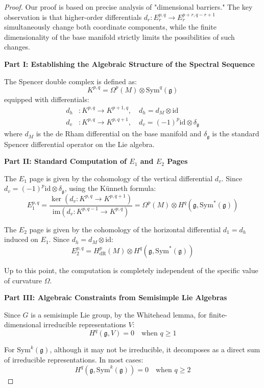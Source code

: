 \documentclass[a4paper,12pt]{extarticle}
\theoremstyle{definition}
\begin{document}
\begin{proof}
Our proof is based on precise analysis of "dimensional barriers." The key observation is that higher-order differentials $d_r: E_r^{p,q} \to E_r^{p+r,q-r+1}$ simultaneously change both coordinate components, while the finite dimensionality of the base manifold strictly limits the possibilities of such changes.

\textbf{Part I: Establishing the Algebraic Structure of the Spectral Sequence}

The Spencer double complex is defined as:
$$K^{p,q} = \Omega^p(M) \otimes \text{Sym}^q(\mathfrak{g})$$
equipped with differentials:
\begin{align}
d_h &: K^{p,q} \to K^{p+1,q}, \quad d_h = d_M \otimes \text{id} \\
d_v &: K^{p,q} \to K^{p,q+1}, \quad d_v = (-1)^p \text{id} \otimes \delta_\mathfrak{g}
\end{align}
where $d_M$ is the de Rham differential on the base manifold and $\delta_\mathfrak{g}$ is the standard Spencer differential operator on the Lie algebra.

\textbf{Part II: Standard Computation of $E_1$ and $E_2$ Pages}

The $E_1$ page is given by the cohomology of the vertical differential $d_v$. Since $d_v = (-1)^p \text{id} \otimes \delta_\mathfrak{g}$, using the Künneth formula:
$$E_1^{p,q} = \frac{\ker(d_v: K^{p,q} \to K^{p,q+1})}{\text{im}(d_v: K^{p,q-1} \to K^{p,q})} = \Omega^p(M) \otimes H^q(\mathfrak{g}, \text{Sym}^*(\mathfrak{g}))$$

The $E_2$ page is given by the cohomology of the horizontal differential $d_1 = d_h$ induced on $E_1$. Since $d_h = d_M \otimes \text{id}$:
$$E_2^{p,q} = H^p_{\text{dR}}(M) \otimes H^q(\mathfrak{g}, \text{Sym}^*(\mathfrak{g}))$$

Up to this point, the computation is completely independent of the specific value of curvature $\Omega$.

\textbf{Part III: Algebraic Constraints from Semisimple Lie Algebras}

Since $G$ is a semisimple Lie group, by the Whitehead lemma, for finite-dimensional irreducible representations $V$:
$$H^q(\mathfrak{g}, V) = 0 \quad \text{when } q \geq 1$$

For $\text{Sym}^k(\mathfrak{g})$, although it may not be irreducible, it decomposes as a direct sum of irreducible representations. In most cases:
$$H^q(\mathfrak{g}, \text{Sym}^k(\mathfrak{g})) = 0 \quad \text{when } q \geq 2$$


\end{proof}
\end{document}
